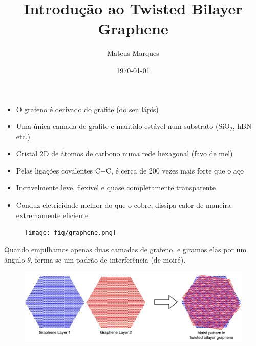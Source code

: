 \documentclass[10pt,aspectratio=169,xcolor={table,dvipsnames,usenames}]{beamer}
\title[Introdução ao Twisted Bilayer Graphene]{\LARGE{Introdução ao Twisted Bilayer Graphene}}
\author[Mateus Marques]{
\large{Mateus Marques
}}
\date{\today}
\begin{document}
\begin{frame}
  \titlepage
\end{frame}


\begin{frame}%

\begin{itemize}
\item O grafeno é derivado do grafite (do seu lápis)

\item Uma única camada de grafite e mantido estável num substrato (SiO$_2$, hBN etc.)

\item Cristal 2D de átomos de carbono numa rede hexagonal (favo de mel)

\item Pelas ligações covalentes C$-$C, é cerca de 200 vezes mais forte que o aço

\item Incrivelmente leve, flexível e quase completamente transparente

\item Conduz eletricidade melhor do que o cobre, dissipa calor de maneira extremamente eficiente
\end{itemize}

\begin{figure}[H]
\centering
\texttt{[image: fig/graphene.png]}
\label{fig:graphene}
\end{figure}

\end{frame}


\begin{frame}%

Quando empilhamos apenas duas camadas de grafeno, e giramos elas por um ângulo $\theta$, forma-se um padrão de interferência (de moiré).

\begin{figure}[H]
\centering
\includegraphics[height=0.32\linewidth]{fig/moire.png}
\label{fig:moire}
\end{figure}

\end{frame}
\end{document}
